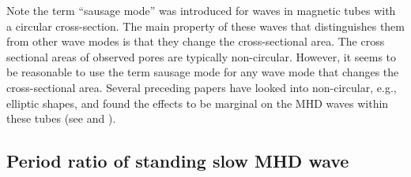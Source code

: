   	Note the term ``sausage mode'' was introduced for waves in magnetic tubes with a circular cross-section.
  	The main property of these waves that distinguishes them from other wave modes is that they change the cross-sectional area.
  	The cross sectional areas of observed pores are typically non-circular.
  	However, it seems to be reasonable to use the term sausage mode for any wave mode that changes the cross-sectional area.
  	Several preceding papers have looked into non-circular, e.g., elliptic shapes, and found the effects to be marginal on the MHD waves within these tubes (see \citealt{2009A&A...494..295E} and \citealt{2011A&A...527A..53M}).
  	  
    \subsection{Period ratio of standing slow MHD wave}
    
